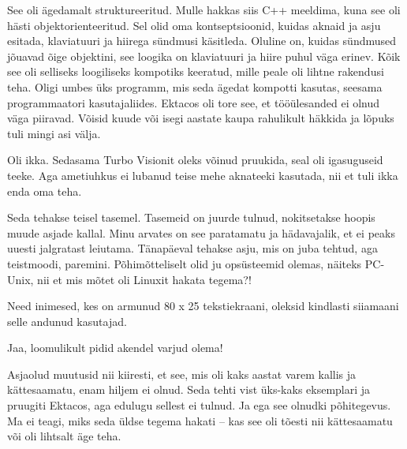 
See oli ägedamalt struktureeritud. Mulle hakkas siis 
C++ meeldima, kuna see oli hästi objektorienteeritud. Sel olid 
oma kontseptsioonid, kuidas aknaid ja asju esitada, klaviatuuri ja hiirega 
sündmusi käsitleda. Oluline on, kuidas sündmused jõuavad õige objektini, see loogika on klaviatuuri 
ja hiire puhul väga erinev. Kõik see oli selliseks loogiliseks kompotiks keeratud, mille peale oli lihtne rakendusi teha. Oligi umbes üks programm, mis seda ägedat kompotti kasutas, seesama programmaatori kasutajaliides. Ektacos oli tore see, et 
tööülesanded ei olnud väga piiravad. Võisid kuude või isegi aastate kaupa rahulikult häkkida ja lõpuks tuli mingi asi 
välja. 


Oli ikka. Sedasama Turbo Visionit oleks võinud pruukida, seal oli 
igasuguseid teeke. Aga ametiuhkus ei lubanud 
teise mehe aknateeki kasutada, nii et tuli ikka enda oma teha. 


Seda tehakse teisel tasemel. Tasemeid on juurde tulnud, 
nokitsetakse hoopis muude asjade kallal. Minu arvates on see
paratamatu ja hädavajalik, et ei peaks uuesti
jalgratast leiutama. Tänapäeval tehakse asju, mis on juba tehtud, aga teistmoodi, 
paremini. Põhimõtteliselt olid ju opsüsteemid olemas, näiteks PC-Unix, nii et mis mõtet oli 
Linuxit hakata tegema?! 



Need inimesed, kes on armunud 80 x 25 tekstiekraani, oleksid kindlasti siiamaani selle andunud kasutajad. 


Jaa, loomulikult pidid akendel varjud olema!


Asjaolud muutusid nii kiiresti, et see, mis oli kaks aastat varem kallis ja kättesaamatu, enam hiljem ei olnud. Seda tehti vist üks-kaks eksemplari ja pruugiti Ektacos, aga edulugu sellest ei tulnud. Ja ega see olnudki põhitegevus. 
Ma ei teagi, miks seda üldse tegema hakati – kas see oli tõesti 
nii kättesaamatu või oli lihtsalt äge teha.

